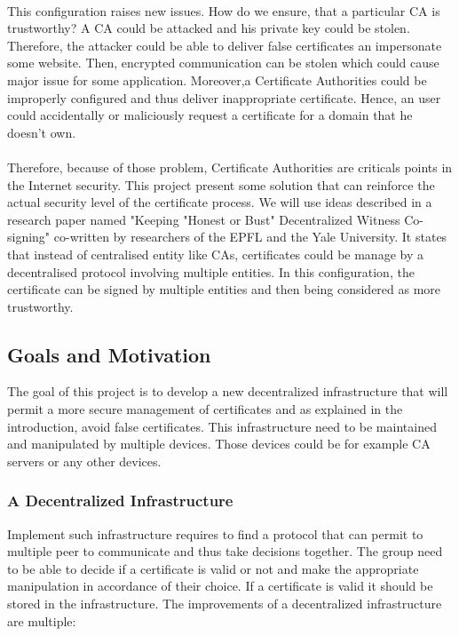 \documentclass[11pt, a4paper, twoside, openright]{article}
\begin{document}
\paragraph{}
This configuration raises new issues. How do we ensure, that a particular CA is trustworthy? A CA could be attacked and his private key could be stolen. Therefore, the attacker could be able to deliver false certificates an impersonate some website. Then, encrypted communication can be stolen which could cause major issue for some application.  
Moreover,a Certificate Authorities could be improperly configured and thus deliver inappropriate certificate. Hence, an user could accidentally or maliciously request a certificate for a domain that he doesn't own. 
\paragraph{}
Therefore, because of those problem, Certificate Authorities are criticals points in the Internet security.
This project present some solution that can reinforce the actual security level of the certificate process. We will use ideas described in a research paper named "Keeping "Honest or Bust" Decentralized Witness Co-signing" \cite{1} co-written by researchers of the EPFL and the Yale University. It states that instead of centralised entity like CAs, certificates could be manage by a decentralised protocol involving multiple entities. In this configuration, the certificate can be signed by multiple entities and then being considered as more trustworthy.
\subsection{Goals and Motivation}
The goal of this project is to develop a new decentralized infrastructure that will permit a more secure management of certificates and as explained in the introduction, avoid false certificates. This infrastructure need to be maintained and manipulated by multiple devices. Those devices could be for example CA servers or any other devices. 
\subsubsection{A Decentralized Infrastructure}
Implement such infrastructure requires to find a protocol that can permit to multiple peer to communicate and thus take decisions together. The group need to be able to decide if a certificate is valid or not and make the appropriate manipulation in accordance of their choice. If a certificate is valid it should be stored in the infrastructure.
The improvements of a decentralized infrastructure are multiple:
\end{document}
